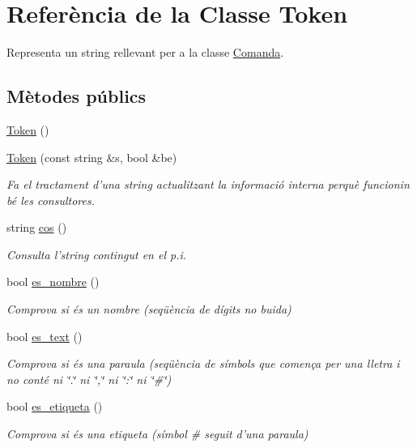 \hypertarget{class_token}{\section{Referència de la Classe Token}
\label{class_token}
}


Representa un string rellevant per a la classe \hyperlink{class_comanda}{Comanda}.  


\subsection*{Mètodes públics}
\begin{DoxyCompactItemize}
\item 
\hyperlink{class_token_aa3c5868ba4115f3189df6b2ac5b36f39}{Token} ()
\item 
\hyperlink{class_token_a2ecb0099476455ed7ce3c05abcbb2e31}{Token} (const string \&s, bool \&be)
\begin{DoxyCompactList}\small\item\em Fa el tractament d'una string actualitzant la informació interna perquè funcionin bé les consultores. \end{DoxyCompactList}\item 
string \hyperlink{class_token_a3cadf105c92e161b50eea2d8096cb608}{cos} ()
\begin{DoxyCompactList}\small\item\em Consulta l'string contingut en el p.\-i. \end{DoxyCompactList}\item 
bool \hyperlink{class_token_a53411d8b5b08289a126944104d246380}{es\-\_\-nombre} ()
\begin{DoxyCompactList}\small\item\em Comprova si és un nombre (seqüència de dígits no buida) \end{DoxyCompactList}\item 
bool \hyperlink{class_token_ab40c482fd70278c5f8ce53aa364d957e}{es\-\_\-text} ()
\begin{DoxyCompactList}\small\item\em Comprova si és una paraula (seqüència de símbols que comença per una lletra i no conté ni \char`\"{}.\char`\"{} ni \char`\"{},\char`\"{} ni \char`\"{}\-:\char`\"{} ni \char`\"{}\#\char`\"{}) \end{DoxyCompactList}\item 
bool \hyperlink{class_token_ad2949808a3a5d2afba78768e18005cbd}{es\-\_\-etiqueta} ()
\begin{DoxyCompactList}\small\item\em Comprova si és una etiqueta (símbol \# seguit d'una paraula) \end{DoxyCompactList}\item 

\end{DoxyCompactItemize}

